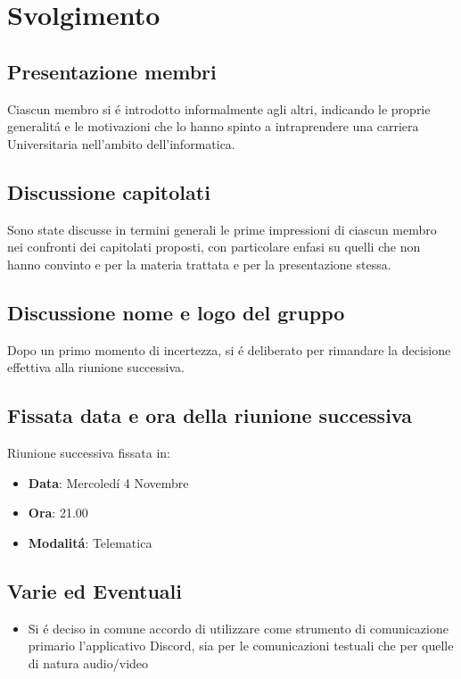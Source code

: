 \documentclass[]{article}
\begin{document}
	\newpage

	\section{Svolgimento}
	\subsection{Presentazione membri}
	Ciascun membro si é introdotto informalmente agli altri, indicando le proprie generalitá e le motivazioni che lo hanno spinto a intraprendere una carriera Universitaria nell'ambito dell'informatica.\\

	\subsection{Discussione capitolati}
	Sono state discusse in termini generali le prime impressioni di ciascun membro nei confronti dei capitolati proposti, con particolare enfasi su quelli che non hanno convinto e per la materia trattata e per la presentazione stessa. \\

	\subsection{Discussione nome e logo del gruppo}
	Dopo un primo momento di incertezza, si é deliberato per rimandare la decisione effettiva alla riunione successiva.

	\subsection{Fissata data e ora della riunione successiva}
	Riunione successiva fissata in:
	\begin{itemize}
		\item \textbf{Data}: Mercoledí 4 Novembre
		\item \textbf{Ora}: 21.00
		\item \textbf{Modalitá}: Telematica
	\end{itemize}

	\subsection{Varie ed Eventuali}
	\begin{itemize}
		\item Si é deciso in comune accordo di utilizzare come strumento di comunicazione primario l'applicativo Discord, sia per le comunicazioni testuali che per quelle di natura audio/video
	\end{itemize}

	
\end{document}
